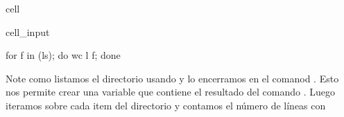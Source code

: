 \documentclass[letterpaper,10pt,english]{jupyterBook}
\begin{document}
\begin{sphinxuseclass}{cell}\begin{sphinxVerbatimInput}

\begin{sphinxuseclass}{cell_input}
\begin{sphinxVerbatim}[commandchars=\\\{\}]
for f in \PYGZdl{}(ls);
    do wc \PYGZhy{}l \PYGZdl{}f;
        done
\end{sphinxVerbatim}

\end{sphinxuseclass}\end{sphinxVerbatimInput}

\end{sphinxuseclass}
\sphinxAtStartPar
Note como listamos el directorio usando  y lo encerramos en el comanod  \sphinxcode{\sphinxupquote{\$()}}. Esto nos permite crear una variable que contiene el resultado del comando .
Luego iteramos sobre cada item del directorio  y contamos el número de líneas con 
\end{document}
